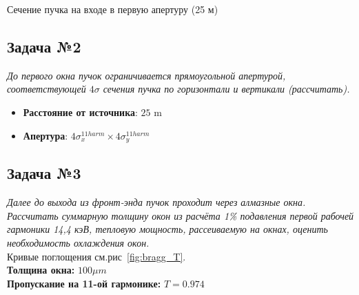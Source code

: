 \documentclass[14pt,a4paper]{extarticle}
\numberwithin{equation}{section}
\begin{document}
	\begin{table}[h!]
		\renewcommand*\dtlrealalign{S}
		\caption{Сечение пучка на входе в первую апертуру (25 м)}
		\centering
		\label{table:size_obeam}
	\end{table}
	
	\subsection{Задача №2}
	\textit{До первого окна пучок ограничивается прямоугольной апертурой, соответствующей $4\sigma$ сечения пучка по горизонтали и вертикали (рассчитать).}
	\begin{itemize}
		\item 	\textbf{Расстояние от источника}: $25$ m 
		\item 	\textbf{Апертура}: $4\sigma^{11 harm}_{x} \times 4\sigma^{11 harm}_{y}$
	\end{itemize}
	
	\subsection{Задача №3}
	\textit{Далее до выхода из фронт-энда пучок проходит через алмазные окна. Рассчитать суммарную толщину окон из расчёта 1\% подавления первой рабочей гармоники 14,4 кэВ, тепловую мощность, рассеиваемую на окнах, оценить необходимость охлаждения окон.}\\
	Кривые поглощения см.рис~\ref{fig:bragg_T}.\\
	\textbf{Толщина окна:} $100\mu m$\\
	\textbf{Пропускание на 11-ой гармонике:} $T = 0.974 $\\
	
\end{document}
